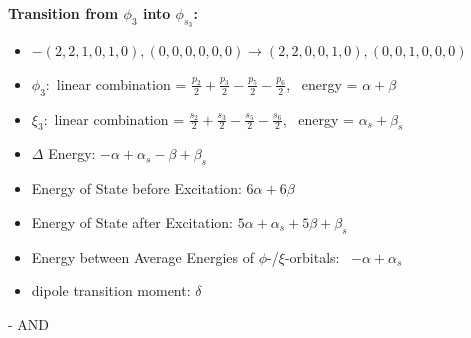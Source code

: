 \documentclass[12pt,a4paper]{article}
\begin{document}
        \noindent\textbf{Transition from $\phi_{3}$ into $\phi_{s_{3}}$:}
        \begin{itemize}
            \item $- (2, 2, 1, 0, 1, 0), (0, 0, 0, 0, 0, 0) \rightarrow (2, 2, 0, 0, 1, 0), (0, 0, 1, 0, 0, 0)$
        
            \item $\phi_{3}:$ linear combination = $\frac{p_{2}}{2} + \frac{p_{3}}{2} - \frac{p_{5}}{2} - \frac{p_{6}}{2}$, \
            energy = $\alpha + \beta$
            
            \item $\xi_{3}:$ linear combination = $\frac{s_{2}}{2} + \frac{s_{3}}{2} - \frac{s_{5}}{2} - \frac{s_{6}}{2}$, \
            energy = $\alpha_{s} + \beta_{s}$
            
            \item $\Delta$ Energy: $- \alpha + \alpha_{s} - \beta + \beta_{s}$
            \item Energy of State before Excitation: $6 \alpha + 6 \beta$
            \item Energy of State after Excitation: $5 \alpha + \alpha_{s} + 5 \beta + \beta_{s}$
            \item Energy between Average Energies of $\phi$-/$\xi$-orbitals: \
            $- \alpha + \alpha_{s}$
        
            \item dipole transition moment: $\delta$
        
        \end{itemize}
        
 -  AND 
\end{document}
